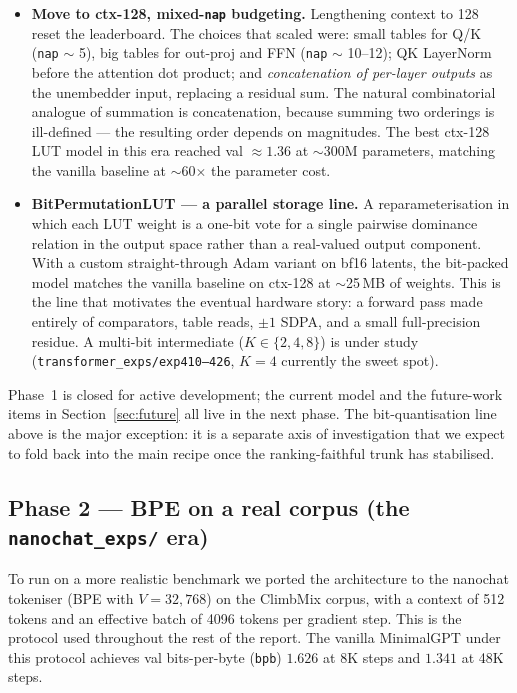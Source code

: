 \documentclass[11pt]{article}
\begin{document}
\begin{itemize}
    \item \textbf{Move to ctx-128, mixed-\texttt{nap} budgeting.} Lengthening context to 128 reset the leaderboard. The choices that scaled were: small tables for Q/K (\texttt{nap} $\sim$ 5), big tables for out-proj and FFN (\texttt{nap} $\sim$ 10--12); QK LayerNorm before the attention dot product; and \emph{concatenation of per-layer outputs} as the unembedder input, replacing a residual sum. The natural combinatorial analogue of summation is concatenation, because summing two orderings is ill-defined --- the resulting order depends on magnitudes. The best ctx-128 LUT model in this era reached val $\approx 1.36$ at $\sim$300M parameters, matching the vanilla baseline at $\sim$60$\times$ the parameter cost.
    \item \textbf{BitPermutationLUT --- a parallel storage line.} A reparameterisation in which each LUT weight is a one-bit vote for a single pairwise dominance relation in the output space rather than a real-valued output component. With a custom straight-through Adam variant on bf16 latents, the bit-packed model matches the vanilla baseline on ctx-128 at $\sim$25\,MB of weights. This is the line that motivates the eventual hardware story: a forward pass made entirely of comparators, table reads, $\pm 1$ SDPA, and a small full-precision residue. A multi-bit intermediate ($K \in \{2, 4, 8\}$) is under study (\texttt{transformer\_exps/exp410--426}, $K=4$ currently the sweet spot).
\end{itemize}
Phase~1 is closed for active development; the current model and the future-work items in Section~\ref{sec:future} all live in the next phase.
The bit-quantisation line above is the major exception: it is a separate axis of investigation that we expect to fold back into the main recipe once the ranking-faithful trunk has stabilised.

\subsection{Phase 2 --- BPE on a real corpus (the \texttt{nanochat\_exps/} era)}
\label{sec:evolution:nanochat}

To run on a more realistic benchmark we ported the architecture to the nanochat tokeniser (BPE with $V = 32{,}768$) on the ClimbMix corpus, with a context of 512 tokens and an effective batch of 4096 tokens per gradient step.
This is the protocol used throughout the rest of the report.
The vanilla MinimalGPT under this protocol achieves val bits-per-byte (\texttt{bpb}) $1.626$ at 8K steps and $1.341$ at 48K steps.
\end{document}
